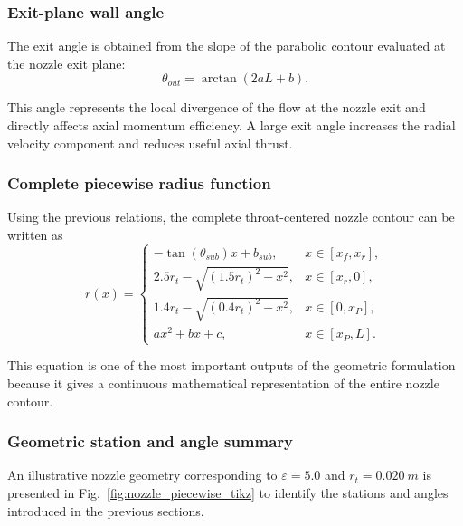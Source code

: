 \subsubsection{Exit-plane wall angle}

The exit angle is obtained from the slope of the parabolic contour evaluated at the nozzle exit plane:
\begin{equation}
\theta_{out}=\arctan\left(2aL+b\right).
\label{eq:theta_out}
\end{equation}

This angle represents the local divergence of the flow at the nozzle exit and directly affects axial momentum efficiency. A large exit angle increases the radial velocity component and reduces useful axial thrust.

\subsubsection{Complete piecewise radius function}

Using the previous relations, the complete throat-centered nozzle contour can be written as
\begin{equation}
r(x)=
\begin{cases}
-\tan(\theta_{sub})x+b_{sub},
& x\in[x_f,x_r],\\[6pt]
2.5r_t-\sqrt{(1.5r_t)^2-x^2},
& x\in[x_r,0],\\[6pt]
1.4r_t-\sqrt{(0.4r_t)^2-x^2},
& x\in[0,x_P],\\[6pt]
ax^2+bx+c,
& x\in[x_P,L].
\end{cases}
\label{eq:piecewise_nozzle}
\end{equation}

This equation is one of the most important outputs of the geometric formulation because it gives a continuous mathematical representation of the entire nozzle contour.

\subsubsection{Geometric station and angle summary}

An illustrative nozzle geometry corresponding to $\varepsilon=5.0$ and $r_t=\SI{0.020}{m}$ is presented in Fig.~\ref{fig:nozzle_piecewise_tikz} to identify the stations and angles introduced in the previous sections.

